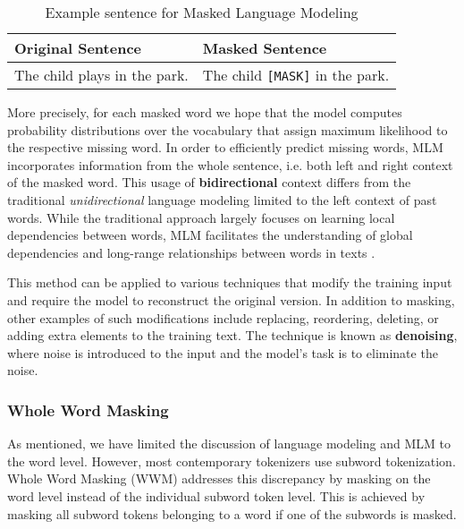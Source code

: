 \begin{table}[htb]
    \centering
    \begin{tabular}{p{} p{}}
        \toprule
        \textbf{Original Sentence} & \textbf{Masked Sentence} \\
        \midrule
        The child plays in the park. & The child \texttt{[MASK]} in the park. \\
        \bottomrule
    \end{tabular}
    \caption{Example sentence for Masked Language Modeling}
    \label{tab:mlm_example}
\end{table}

More precisely, for each masked word we hope that the model computes probability
distributions over the vocabulary that assign maximum likelihood to the
respective missing word. In order to efficiently predict missing words, MLM
incorporates information from the whole sentence, i.e. both left and right
context of the masked word. This usage of \textbf{bidirectional} context differs
from the traditional \textit{unidirectional} language modeling limited to the
left context of past words. While the traditional approach largely focuses on
learning local dependencies between words, MLM facilitates the understanding of
global dependencies and long-range relationships between words in texts
\cite{jurafsky2025slp}. 

This method can be applied to various techniques that modify the training input
and require the model to reconstruct the original version. In addition to
masking, other examples of such modifications include replacing, reordering,
deleting, or adding extra elements to the training text. The technique is known
as \textbf{denoising}, where noise is introduced to the input and the model’s
task is to eliminate the noise.

\subsubsection{Whole Word Masking} \label{subsec:wwm}
As mentioned, we have limited the discussion of language modeling and MLM to the
word level. However, most contemporary tokenizers use subword tokenization.
Whole Word Masking (WWM) addresses this discrepancy by masking on the word level
instead of the individual subword token level. This is achieved by masking all
subword tokens belonging to a word if one of the subwords is masked. 


